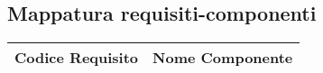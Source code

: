 \begin{longtable}{ p{9cm} | p{5cm} }
	
																		
			
																
			\hline
		
		\end{longtable}




\subsection{Mappatura requisiti-componenti}

		\begin{tabular}{ p{7cm} | p{7cm} }
			\hline
			\textbf{Codice Requisito} & \textbf{Nome Componente} \\
			\hline
			
			
		\end{tabular}